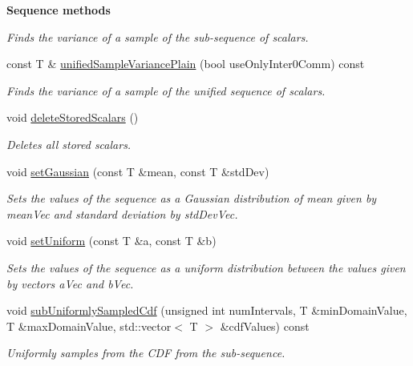 \begin{Indent}{\bf Sequence methods}
\begin{DoxyCompactItemize}
\begin{DoxyCompactList}\small\item\em Finds the variance of a sample of the sub-\/sequence of scalars. \end{DoxyCompactList}\item 
const T \& \hyperlink{class_q_u_e_s_o_1_1_scalar_sequence_a65ce41a3d29fa1cc1ae5d230dd0daf43}{unified\-Sample\-Variance\-Plain} (bool use\-Only\-Inter0\-Comm) const 
\begin{DoxyCompactList}\small\item\em Finds the variance of a sample of the unified sequence of scalars. \end{DoxyCompactList}\item 
void \hyperlink{class_q_u_e_s_o_1_1_scalar_sequence_ab3ca8a505e862abfc5e0f39b46b124c6}{delete\-Stored\-Scalars} ()
\begin{DoxyCompactList}\small\item\em Deletes all stored scalars. \end{DoxyCompactList}\item 
void \hyperlink{class_q_u_e_s_o_1_1_scalar_sequence_a117f63a50e67106777e0fea36a62d994}{set\-Gaussian} (const T \&mean, const T \&std\-Dev)
\begin{DoxyCompactList}\small\item\em Sets the values of the sequence as a Gaussian distribution of mean given by {\ttfamily mean\-Vec} and standard deviation by {\ttfamily std\-Dev\-Vec}. \end{DoxyCompactList}\item 
void \hyperlink{class_q_u_e_s_o_1_1_scalar_sequence_a08f24dc39a24beabcdbea61d8dc0756f}{set\-Uniform} (const T \&a, const T \&b)
\begin{DoxyCompactList}\small\item\em Sets the values of the sequence as a uniform distribution between the values given by vectors {\ttfamily a\-Vec} and {\ttfamily b\-Vec}. \end{DoxyCompactList}\item 
void \hyperlink{class_q_u_e_s_o_1_1_scalar_sequence_a58405305f35483e422012f986eb06aa1}{sub\-Uniformly\-Sampled\-Cdf} (unsigned int num\-Intervals, T \&min\-Domain\-Value, T \&max\-Domain\-Value, std\-::vector$<$ T $>$ \&cdf\-Values) const 
\begin{DoxyCompactList}\small\item\em Uniformly samples from the C\-D\-F from the sub-\/sequence. \end{DoxyCompactList}\item 

\end{DoxyCompactItemize}
\end{Indent}
